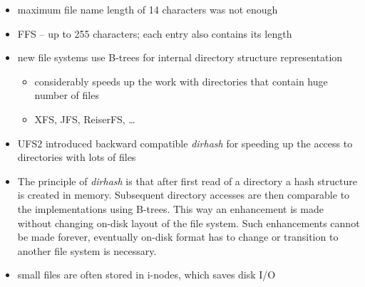 \begin{slide}
\begin{itemize}
\item maximum file name length of 14 characters was not enough
\item FFS -- up to 255 characters; each entry also contains its length
\item new file systems use B-trees for internal directory structure
representation
    \begin{itemize}
    \item considerably speeds up the work with directories that contain huge
    number of files
    \item XFS, JFS, ReiserFS, \dots
    \end{itemize}
\item UFS2 introduced backward compatible \emph{dirhash} for speeding up
the access to directories with lots of files
\end{itemize}
\end{slide}

\begin{itemize}
\item The principle of \emph{dirhash} is that after first read of a directory a
hash structure is created in memory. Subsequent directory accesses are then
comparable to the implementations using B-trees. This way an enhancement is made
without changing on-disk layout of the file system. Such enhancements cannot be
made forever, eventually on-disk format has to change or transition to another
file system is necessary.
\item small files are often stored in i-nodes, which saves disk I/O
\end{itemize}


\label{VFS}

\begin{slide}
\begin{center}

\end{center}
\end{slide}

